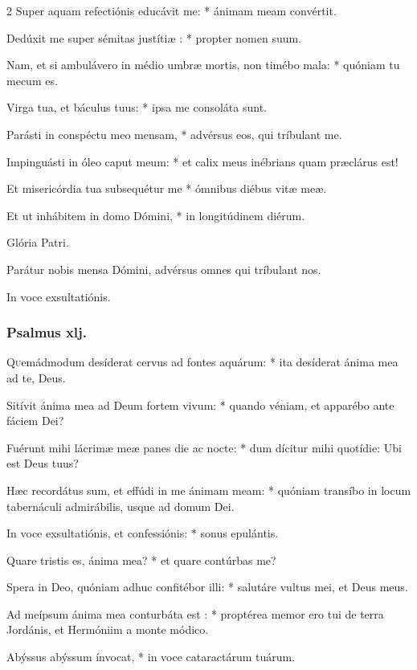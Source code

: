 \documentclass[9pt,twoside]{extarticle}
\begin{document}
\begin{multicols}{2}
Super aquam refectiónis educávit me: * ánimam meam convértit.

Dedúxit me super sémitas justítiæ : * propter nomen suum.

Nam, et si ambulávero in médio umbræ mortis, non timébo mala: * quóniam tu mecum es.

Virga tua, et báculus tuus: * ipsa me consoláta sunt.

Parásti in conspéctu meo mensam, * advérsus eos, qui tríbulant me.

Impinguásti in óleo caput meum: * et calix meus inébrians quam præclárus est!

Et misericórdia tua subsequétur me * ómnibus diébus vitæ meæ.

Et ut inhábitem in domo Dómini, * in longitúdinem diérum.

Glória Patri.

\begin{tightlist}{}
\item {} Parátur nobis mensa Dómini, advérsus omnes qui tríbulant nos.
\item {} In voce exsultatiónis.
\end{tightlist}

\subsubsection*{\center Psalmus xlj.}
\lettrine{Q}uemádmodum desíderat cervus ad fontes aquárum: * ita desíderat ánima mea ad te, Deus.

Sitívit ánima mea ad Deum fortem vivum: * quando véniam, et apparébo ante fáciem Dei?

Fuérunt mihi lácrimæ meæ panes die ac nocte: * dum dícitur mihi quotídie: Ubi est Deus tuus?

Hæc recordátus sum, et effúdi in me ánimam meam: * quóniam transíbo in locum tabernáculi admirábilis, usque ad domum Dei.

In voce exsultatiónis, et confessiónis: * sonus epulántis.

Quare tristis es, ánima mea? * et quare contúrbas me?

Spera in Deo, quóniam adhuc confitébor illi: * salutáre vultus mei, et Deus meus.

Ad meípsum ánima mea conturbáta est : * proptérea memor ero tui de terra Jordánis, et Hermóniim a monte módico.

Abýssus abýssum ínvocat, * in voce cataractárum tuárum.


\end{multicols}
\end{document}
